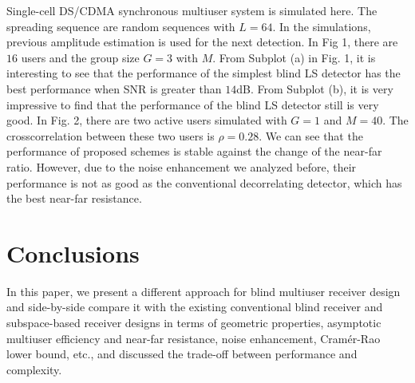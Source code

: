 \documentclass[conference]{IEEEtran}
\begin{document}
\begin{figure} \label{BER}
\end{figure}

Single-cell DS/CDMA synchronous multiuser system is simulated
here. The spreading sequence are random sequences with $L=64$. In
the simulations, previous amplitude estimation is used for the
next detection. In Fig 1, there are $16$ users and the group size
$G=3$ with $M$. From Subplot (a) in Fig. 1, it is interesting to
see that the performance of the simplest blind LS detector has the
best performance when SNR is greater than $14$dB. From Subplot
(b), it is very impressive to find that the performance of the
blind LS detector still is very good. In Fig. 2, there are two
active users simulated with $G=1$ and $M=40$. The crosscorrelation
between these two users is $\rho=0.28$. We can see that the
performance of proposed schemes is stable against the change of
the near-far ratio. However, due to the noise enhancement we
analyzed before, their performance is not as good as the
conventional decorrelating detector, which has the best near-far
resistance.

\begin{figure} \label{NFR}
\end{figure}

\section{Conclusions}
In this paper, we present a different approach for blind multiuser
receiver design and side-by-side compare it with the existing
conventional blind receiver and subspace-based receiver designs in
terms of geometric properties, asymptotic multiuser efficiency and
near-far resistance, noise enhancement, Cram\'{e}r-Rao lower
bound, etc., and discussed the trade-off between performance and
complexity.


\end{document}
